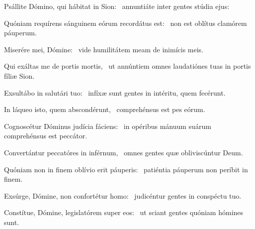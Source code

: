 \item Psállite Dómino, qui hábitat in Sion:~\psstar{} annuntiáte inter gentes stúdia ejus:
\item Quóniam requírens sánguinem eórum recordátus est:~\psstar{} non est oblítus clamórem páuperum.
\item Miserére mei, Dómine:~\psstar{} vide humilitátem meam de inimícis meis.
\item Qui exáltas me de portis mortis,~\psstar{} ut annúntiem omnes laudatiónes tuas in portis fíliæ Sion.
\item Exsultábo in salutári tuo:~\psstar{} infíxæ sunt gentes in intéritu, quem fecérunt.
\item In láqueo isto, quem abscondérunt,~\psstar{} comprehénsus est pes eórum.
\item Cognoscétur Dóminus judícia fáciens:~\psstar{} in opéribus mánuum suárum comprehénsus est peccátor.
\item Convertántur peccatóres in inférnum,~\psstar{} omnes gentes quæ obliviscúntur Deum.
\item Quóniam non in finem oblívio erit páuperis:~\psstar{} patiéntia páuperum non períbit in finem.
\item Exsúrge, Dómine, non confortétur homo:~\psstar{} judicéntur gentes in conspéctu tuo.
\item Constítue, Dómine, legislatórem super eos:~\psstar{} ut sciant gentes quóniam hómines sunt.
